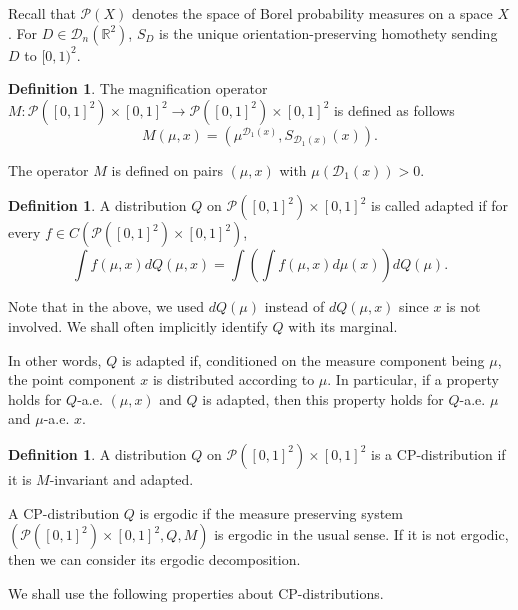 \documentclass[a4paper,11pt]{amsart}
\theoremstyle{definition}
\newtheorem{definition}[theorem]{Definition}
\numberwithin{equation}{section}
\def\to{\rightarrow}
\def\D{\mathcal{D}}
\def\cP{\mathcal P}
\def\R{\mathbb R}
\begin{document}
Recall that $\cP(X)$ denotes the space of Borel probability measures on a space  $X$.  For $D\in \D_n(\R^2)$,  $S_{D}$ is the unique orientation-preserving homothety sending $D$ to $[0,1)^2$.
\begin{definition}
The magnification operator $M :\cP([0,1]^2)\times [0,1]^2 \to \cP([0,1]^2)\times [0,1]^2$ is defined as  follows
\[
M(\mu, x) = (\mu^{\D_1(x)}, S_{\D_1(x)}(x)).
\]
\end{definition}
The operator $M$ is defined on pairs $(\mu,x)$ with $\mu(\D_1(x))>0$.    
\begin{definition}
A distribution $Q$ on $\cP([0,1]^2)\times [0,1]^2$
 is called adapted if for every $f \in C(\cP([0,1]^2)\times [0,1]^2)$,
\[
\int f(\mu, x)d Q(\mu, x) = \int \left(\int f(\mu, x)d\mu(x)\right) d Q(\mu).
\]
\end{definition}
Note that in the above, we used $d Q(\mu)$ instead of $dQ(\mu, x)$  since $x$   is not involved.  We shall often implicitly identify $Q$ with its marginal.

In other words, $Q$ is adapted if, conditioned on the measure component being $\mu$, the
point component $x$ is distributed according to $\mu$. In particular, if a property holds for
$Q$-a.e. $(\mu, x)$ and $Q$ is adapted, then this property holds for $Q$-a.e. $\mu$ and $\mu$-a.e. $x$.

\begin{definition}
A distribution $Q$ on $\cP([0,1]^2)\times [0,1]^2$ is a CP-distribution if it is
$M$-invariant and adapted.
\end{definition}
A CP-distribution $Q$ is ergodic if the measure preserving system $(\cP([0,1]^2)\times [0,1]^2, Q,M)$ is ergodic in
the usual sense. If it is not ergodic, then we can consider its ergodic decomposition.

We shall use the following properties about CP-distributions.
\end{document}
